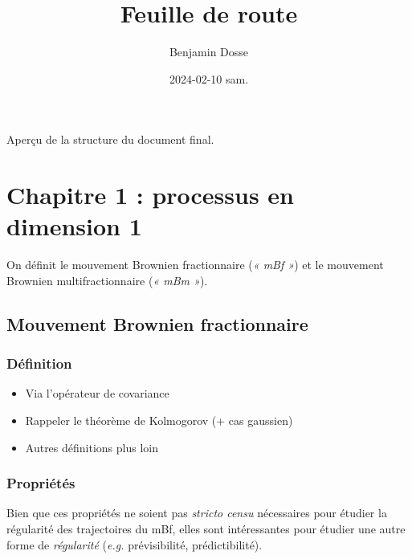 \documentclass[11pt]{article}
\author{Benjamin Dosse}
\date{2024-02-10 sam.}
\title{Feuille de route}
\begin{document}
\maketitle
\begin{center}
Aperçu de la structure du document final. 
\end{center}

\setcounter{tocdepth}{2}
\tableofcontents
\section{Chapitre 1 : processus en dimension 1}
\label{sec:org65c0b25}
On définit le mouvement Brownien fractionnaire (\emph{« mBf »}) et le
mouvement Brownien multifractionnaire (\emph{« mBm »}).
\subsection{Mouvement Brownien fractionnaire}
\label{sec:orgc466ec9}
\subsubsection{Définition}
\label{sec:orgc74afd8}
\begin{itemize}
\item Via l'opérateur de covariance
\item Rappeler le théorème de Kolmogorov (+ cas gaussien)
\item Autres définitions plus loin
\end{itemize}
\subsubsection{Propriétés}
\label{sec:org597e829}
Bien que ces propriétés ne soient pas \emph{stricto censu} nécessaires pour
étudier la régularité des trajectoires du mBf, elles sont
intéressantes pour étudier une autre forme de \emph{régularité} (\emph{e.g.}
prévisibilité, prédictibilité).
\end{document}
